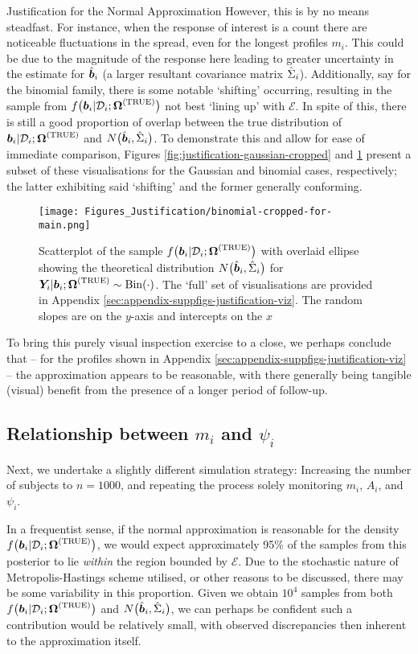 \begin{chapter}{\label{cha:justification}Justification for the Normal Approximation}
  However, this is by no means steadfast. For instance, when the response of interest is a count there are noticeable fluctuations in the spread, even for the longest profiles $m_i$. This could be due to the magnitude of the response here leading to greater uncertainty in the estimate for $\hat{\bm{b}}_i$ (\ie a larger resultant covariance matrix $\hat{\Sigma}_i$). Additionally, say for the binomial family, there is some notable `shifting' occurring, resulting in the sample from $f\big(\bm{b}_i|\mathcal{D}_i;\bm{\mathrm{\Omega}}^{(\mathrm{TRUE})}\big)$ not best `lining up' with $\mathcal{E}$. In spite of this, there is still a good proportion of overlap between the true distribution of $\bm{b}_i|\mathcal{D}_i;\bm{\mathrm{\Omega}}^{(\mathrm{TRUE})}$ and $N\big(\hat{\bm{b}}_i,\hat{\Sigma}_i\big)$. To demonstrate this and allow for ease of immediate comparison, Figures \ref{fig:justification-gaussian-cropped} and \ref{fig:justification-binomial-cropped} present a subset of these visualisations for the Gaussian and binomial cases, respectively; the latter exhibiting said `shifting' and the former generally conforming.

  \begin{figure}[ht]
      \centering
      \texttt{[image: Figures\_Justification/binomial-cropped-for-main.png]}
      \caption{Scatterplot of the sample $f\big(\bm{b}_i|\mathcal{D}_i;\bm{\mathrm{\Omega}}^{(\mathrm{TRUE})}\big)$ with overlaid ellipse showing the theoretical distribution $N\big(\hat{\bm{b}}_i,\hat{\Sigma}_i\big)$ for $\bm{Y}_i|\bm{b}_i;\bm{\mathrm{\Omega}}^{(\mathrm{TRUE})}\sim\mathrm{Bin}\!\left(\cdot\right)$. The `full' set of visualisations are provided in Appendix \ref{sec:appendix-suppfigs-justification-viz}. The random slopes are on the $y$-axis and intercepts on the $x$}
      \label{fig:justification-binomial-cropped}
  \end{figure}

  To bring this purely visual inspection exercise to a close, we perhaps conclude that -- for the profiles shown in Appendix \ref{sec:appendix-suppfigs-justification-viz} -- the approximation appears to be reasonable, with there generally being tangible (visual) benefit from the presence of a longer period of follow-up.
  
  \subsection{Relationship between \texorpdfstring{$m_i$}{mi} and \texorpdfstring{$\psi_i$}{psi}}\label{sec:justification-results-psi}
  Next, we undertake a slightly different simulation strategy: Increasing the number of subjects to $n=1000$, and repeating the process solely monitoring $m_i$, $A_i$, and $\psi_i$. 
  
  In a frequentist sense, if the normal approximation is reasonable for the density $f\big(\bm{b}_i|\mathcal{D}_i;\bm{\mathrm{\Omega}}^{(\mathrm{TRUE})}\big)$, we would expect approximately 95\% of the samples from this posterior to lie \textit{within} the region bounded by $\mathcal{E}$. Due to the stochastic nature of Metropolis-Hastings scheme utilised, or other reasons to be discussed, there may be some variability in this proportion. Given we obtain $10^4$ samples from both $f\big(\bm{b}_i|\mathcal{D}_i;\bm{\mathrm{\Omega}}^{(\mathrm{TRUE})}\big)$ and $N\big(\hat{\bm{b}}_i,\hat{\Sigma}_i\big)$, we can perhaps be confident such a contribution would be relatively small, with observed discrepancies then inherent to the approximation itself.


\end{chapter}

